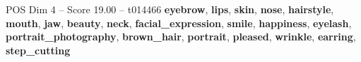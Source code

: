 \begin{textsample}{POS Dim 4 – Score 19.00 – t014466}  \label{ex:f4_pos_027}
\textbf{eyebrow}, \textbf{lips}, \textbf{skin}, \textbf{nose}, \textbf{hairstyle}, \textbf{mouth}, \textbf{jaw}, \textbf{beauty}, \textbf{neck}, \textbf{facial\_expression}, \textbf{smile}, \textbf{happiness}, \textbf{eyelash}, \textbf{portrait\_photography}, \textbf{brown\_hair}, \textbf{portrait}, \textbf{pleased}, \textbf{wrinkle}, \textbf{earring}, \textbf{step\_cutting}

\end{textsample}
